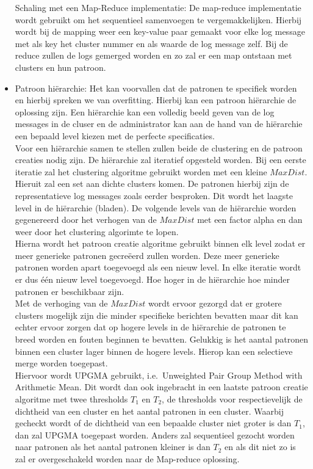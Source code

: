 \begin{itemize}
    \subitem Schaling met een Map-Reduce implementatie: De map-reduce implementatie wordt gebruikt om het sequentieel samenvoegen te vergemakkelijken. Hierbij wordt bij de mapping weer een key-value paar gemaakt voor elke log message met als key het cluster nummer en als waarde de log message zelf. Bij de reduce zullen de logs gemerged worden en zo zal er een map ontstaan met clusters en hun patroon. \\
    
    \item Patroon hiërarchie: Het kan voorvallen dat de patronen te specifiek worden en hierbij spreken we van overfitting. Hierbij kan een patroon hiërarchie de oplossing zijn. Een hiërarchie kan een volledig beeld geven van de log messages in de cluser en de administrator kan aan de hand van de hiërarchie een bepaald level kiezen met de perfecte specificaties.\\
    
    Voor een hiërarchie samen te stellen zullen beide de clustering en de patroon creaties nodig zijn. De hiërarchie zal iteratief opgesteld worden. Bij een eerste iteratie zal het clustering algoritme gebruikt worden met een kleine $MaxDist$. Hieruit zal een set aan dichte clusters komen. De patronen hierbij zijn de representatieve log messages zoals eerder besproken. Dit wordt het laagste level in de hiërarchie (bladen). De volgende levels van de hiërarchie worden gegenereerd door het verhogen van de $MaxDist$ met een factor alpha en dan weer door het clustering algorimte te lopen.\\
    
    Hierna wordt het patroon creatie algoritme gebruikt binnen elk level zodat er meer generieke patronen gecreëerd zullen worden. Deze meer generieke patronen worden apart toegevoegd als een nieuw level. In elke iteratie wordt er dus één nieuw level toegevoegd. Hoe hoger in de hiërarchie hoe minder patronen er beschikbaar zijn.\\
    
    Met de verhoging van de $MaxDist$ wordt ervoor gezorgd dat er grotere clusters mogelijk zijn die minder specifieke berichten bevatten maar dit kan echter ervoor zorgen dat op hogere levels in de hiërarchie de patronen te breed worden en fouten beginnen te bevatten. Gelukkig is het aantal patronen binnen een cluster lager binnen de hogere levels. Hierop kan een selectieve merge worden toegepast.\\
    
    Hiervoor wordt UPGMA gebruikt, i.e.\ Unweighted Pair Group Method with Arithmetic Mean. Dit wordt dan ook ingebracht in een laatste patroon creatie algoritme met twee thresholds \(T_{1}\) en \(T_{2}\), de thresholds voor respectievelijk de dichtheid van een cluster en het aantal patronen in een cluster. Waarbij gecheckt wordt of de dichtheid van een bepaalde cluster niet groter is dan \(T_{1}\), dan zal UPGMA toegepast worden. Anders zal sequentieel gezocht worden naar patronen als het aantal patronen kleiner is dan \(T_{2}\) en als dit niet zo is zal er overgeschakeld worden naar de Map-reduce oplossing.\\
    

\end{itemize}
